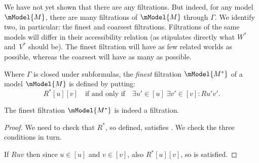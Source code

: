 \documentclass[../../../include/open-logic-section]{subfiles}
\begin{document}


We have not yet shown that there are any filtrations. But indeed, for
any model $\mModel{M}$, there are many filtrations of $\mModel{M}$
through $\Gamma$. We identify two, in particular: the finest and
coarsest filtrations. Filtrations of the same models will differ in
their accessibility relation (as  stipulates
directly what $W^*$ and~$V^*$ should be). The finest filtration
will have as few related worlds as possible, whereas the coarsest will
have as many as possible.

\begin{defn}
  Where $\Gamma$ is closed under subformulas, the \emph{finest}
  filtration $\mModel{M^*}$ of a model $\mModel{M}$ is defined by putting:
  \[
  R^*[u][v] \quad \text{if and only if} \quad \exists u'\in [u] \;
  \exists v' \in [v] : Ru'v'.
  \]
\end{defn}

\begin{prop}
  The finest filtration $\mModel{M^*}$ is indeed a filtration. 
\end{prop}

\begin{proof}
  We need to check that $R^*$, so defined, satisfies
  . We check
  the three conditions in turn.

  If $Ruv$ then since $u \in [u]$ and $v \in [v]$, also $R^*[u][v]$,
  so  is satisfied.
  
  
\end{proof}
\end{document}
